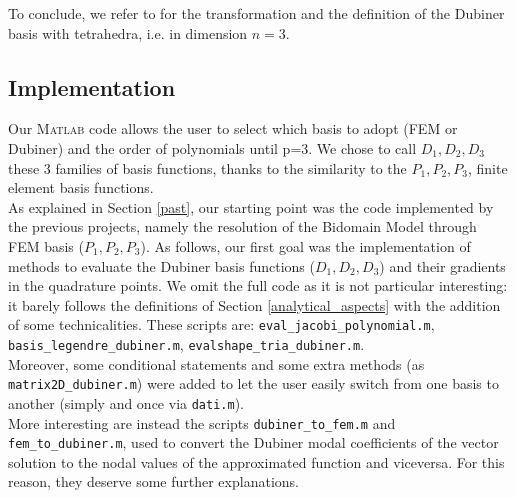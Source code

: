 \documentclass[a4paper,11pt]{article}
\begin{document}
    \noindent To conclude, we refer to \cite{sherwin} for the transformation and the definition of the Dubiner basis with tetrahedra, i.e. in dimension $n=3$.
    
    \subsection{Implementation}
    Our \textsc{Matlab} code allows the user to select which basis to adopt (FEM or Dubiner) and the order of polynomials until p=3. We chose to call $D_1,D_2,D_3$ these 3 families of basis functions, thanks to the similarity to the $P_1,P_2,P_3$, finite element basis functions.\\
    As explained in Section \ref{past}, our starting point was the code implemented by the previous projects, namely the resolution of the Bidomain Model through FEM basis ($P_1,P_2,P_3$). As follows, our first goal was the implementation of methods to evaluate the Dubiner basis functions ($D_1,D_2,D_3$) and their gradients in the quadrature points. We omit the full code as it is not particular interesting: it barely follows the definitions of Section \ref{analytical_aspects} with the addition of some technicalities. These scripts are: \texttt{eval\_jacobi\_polynomial.m}, \texttt{basis\_legendre\_dubiner.m}, \texttt{evalshape\_tria\_dubiner.m}.\\
    
    \noindent Moreover, some conditional statements and some extra methods (as \texttt{matrix2D\_dubiner.m}) were added to let the user easily switch from one basis to another (simply and once via \texttt{dati.m}). \\
    
    \noindent More interesting are instead the scripts \texttt{dubiner\_to\_fem.m} and \texttt{fem\_to\_dubiner.m}, used to convert the Dubiner modal coefficients of the vector solution to the nodal values of the approximated function and viceversa. For this reason, they deserve some further explanations.
\end{document}
